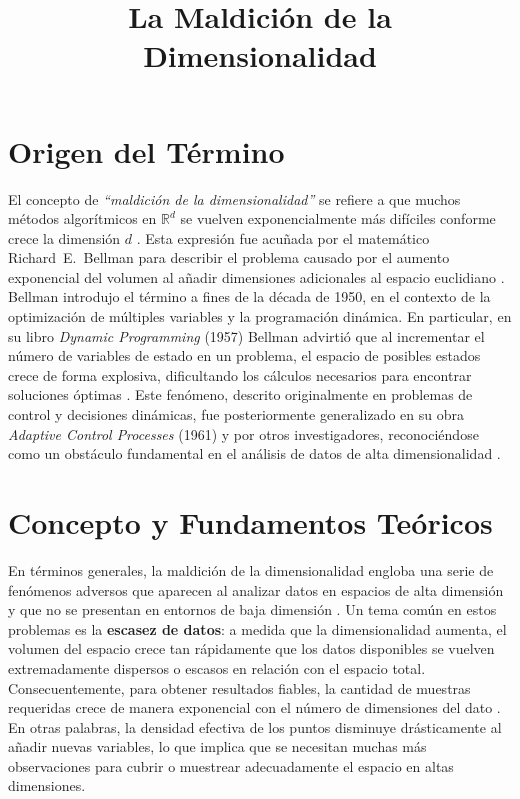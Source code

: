 \documentclass[conference,9pt]{IEEEtran}
\begin{document}
\title{La Maldición de la Dimensionalidad}
\author{
}
\maketitle

\section{Origen del Término}
El concepto de \emph{“maldición de la dimensionalidad”} se refiere a que muchos métodos algorítmicos en $\mathbb{R}^d$ se vuelven exponencialmente más difíciles conforme crece la dimensión $d$ \cite{Verleysen2005}. Esta expresión fue acuñada por el matemático Richard~E.~Bellman para describir el problema causado por el aumento exponencial del volumen al añadir dimensiones adicionales al espacio euclidiano \cite{BellmanDP1957}. Bellman introdujo el término a fines de la década de 1950, en el contexto de la optimización de múltiples variables y la programación dinámica. En particular, en su libro \emph{Dynamic Programming} (1957) Bellman advirtió que al incrementar el número de variables de estado en un problema, el espacio de posibles estados crece de forma explosiva, dificultando los cálculos necesarios para encontrar soluciones óptimas \cite{BellmanDP1957}. Este fenómeno, descrito originalmente en problemas de control y decisiones dinámicas, fue posteriormente generalizado en su obra \emph{Adaptive Control Processes} (1961) \cite{Bellman1961} y por otros investigadores, reconociéndose como un obstáculo fundamental en el análisis de datos de alta dimensionalidad \cite{Zimek2012}.

\section{Concepto y Fundamentos Teóricos}
En términos generales, la maldición de la dimensionalidad engloba una serie de fenómenos adversos que aparecen al analizar datos en espacios de alta dimensión y que no se presentan en entornos de baja dimensión \cite{Verleysen2005}. Un tema común en estos problemas es la \textbf{escasez de datos}: a medida que la dimensionalidad aumenta, el volumen del espacio crece tan rápidamente que los datos disponibles se vuelven extremadamente dispersos o escasos en relación con el espacio total. Consecuentemente, para obtener resultados fiables, la cantidad de muestras requeridas crece de manera exponencial con el número de dimensiones del dato \cite{Zimek2012}. En otras palabras, la densidad efectiva de los puntos disminuye drásticamente al añadir nuevas variables, lo que implica que se necesitan muchas más observaciones para cubrir o muestrear adecuadamente el espacio en altas dimensiones.
\end{document}
